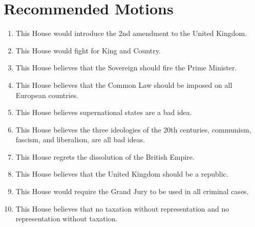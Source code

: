 \section{Recommended Motions}

\begin{enumerate}
    \item This House would introduce the 2nd amendment to the United Kingdom.
    \item This House would fight for King and Country. 
    \item This House believes that the Sovereign should fire the Prime Minister.
    \item This House believes that the Common Law should be imposed on all European countries.
    \item This House believes supernational states are a bad idea. 
    \item This House believes the three ideologies of the 20th centuries, communism, fascism, and liberalism, are all bad ideas.
    \item This House regrets the dissolution of the British Empire. 
    \item This House believes that the United Kingdom should be a republic.
    \item This House would require the Grand Jury to be used in all criminal cases.
    \item This House believes that no taxation without representation and no representation without taxation.
\end{enumerate}